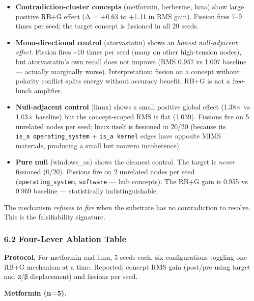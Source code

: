 \documentclass[
  11pt,
  a4paper,
]{article}
\providecommand{\tightlist}{%
  \setlength{\itemsep}{0pt}\setlength{\parskip}{0pt}}
\begin{document}
\begin{itemize}
\tightlist
\item
  \textbf{Contradiction-cluster concepts} (metformin, berberine, luna)
  show large positive RB+G effect (Δ = +0.63 to +1.11 in RMS gain).
  Fission fires 7--9 times per seed; the target concept is fissioned in
  all 20 seeds.
\item
  \textbf{Mono-directional control} (atorvastatin) shows an \emph{honest
  null-adjacent effect}. Fission fires \textasciitilde10 times per seed
  (many on other high-tension nodes), but atorvastatin's own recall does
  not improve (RMS 0.957 vs 1.007 baseline --- actually marginally
  worse). Interpretation: fission on a concept without polarity conflict
  splits energy without accuracy benefit. RB+G is not a free-lunch
  amplifier.
\item
  \textbf{Null-adjacent control} (linux) shows a small positive global
  effect (1.38× vs 1.03× baseline) but the concept-scoped RMS is flat
  (1.039). Fissions fire on 5 unrelated nodes per seed; linux itself is
  fissioned in 20/20 (because its \texttt{is\_a\ operating\_system} +
  \texttt{is\_a\ kernel} edges have opposite MIMS materials, producing a
  small but nonzero incoherence).
\item
  \textbf{Pure null} (windows\_os) shows the cleanest control. The
  target is \emph{never} fissioned (0/20). Fissions fire on 2 unrelated
  nodes per seed (\texttt{operating\_system}, \texttt{software} --- hub
  concepts). The RB+G gain is 0.955 vs 0.969 baseline --- statistically
  indistinguishable.
\end{itemize}

The mechanism \emph{refuses to fire} when the substrate has no
contradiction to resolve. This is the falsifiability signature.

\subsubsection{6.2 Four-Lever Ablation
Table}\label{four-lever-ablation-table}

\textbf{Protocol.} For metformin and luna, 5 seeds each, six
configurations toggling one RB+G mechanism at a time. Reported: concept
RMS gain (post/pre using target and α/β displacement) and fissions per
seed.

\textbf{Metformin (n=5).}
\end{document}
